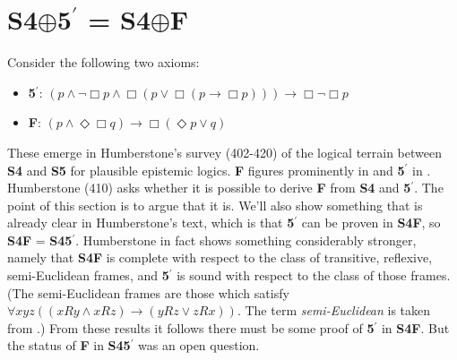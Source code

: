 \documentclass[11pt]{article}
\begin{document}
 \section {\textbf{S4}$\oplus$\textbf{5}$^\prime$ = \textbf{S4}$\oplus$\textbf{F}}
Consider the following two axioms:
\begin{itemize}[label={}]
\item{\textbf{5}$^\prime$\!: $(p \wedge \neg \Box p \wedge \Box (p \vee \Box (p \rightarrow \Box p))) \rightarrow \Box \neg \Box p$ }
\item{\textbf{F}: $(p\wedge \Diamond\Box q) \rightarrow \Box (\Diamond p\vee q)$}
\end{itemize}
These emerge in Humberstone's survey (402-420) of the logical terrain between \textbf{S4} and \textbf{S5} for plausible epistemic logics. \textbf{F} figures prominently in \citet{Stalnaker.2006} and \textbf{5}$^\prime$ in \citet{Voorbraak.1991}. Humberstone (410) asks whether it is possible to derive \textbf{F} from \textbf{S4} and \textbf{5}$^\prime$. The point of this section is to argue that it is. We'll also show something that is already clear in Humberstone's text, which is that \textbf{5}$^\prime$ can be proven in \textbf{S4F}, so \textbf{S4F} = \textbf{S45}$^\prime$. Humberstone in fact shows something considerably stronger, namely that \textbf{S4F} is complete with respect to the class of transitive, reflexive, semi-Euclidean frames, and \textbf{5}$^\prime$ is sound with respect to the class of those frames. (The semi-Euclidean frames are those which satisfy 
$\forall xyz((xRy \wedge xRz) \rightarrow (yRz \vee zRx))$. The term \textit{semi-Euclidean} is taken from \citet{Voorbraak.1991}.) From these results it follows there must be some proof of \textbf{5}$^\prime$ in \textbf{S4F}. But the status of \textbf{F} in \textbf{S45}$^\prime$ was an open question. 
\end{document}
